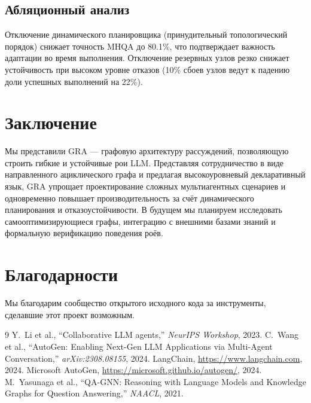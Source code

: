 \documentclass[11pt]{article}
\begin{document}
\subsection{Абляционный анализ}
Отключение динамического планировщика (принудительный топологический порядок) снижает точность MHQA до 80.1\%, что подтверждает важность адаптации во время выполнения.
Отключение резервных узлов резко снижает устойчивость при высоком уровне отказов (10\% сбоев узлов ведут к падению доли успешных выполнений на 22\%).

\section{Заключение}
Мы представили GRA — графовую архитектуру рассуждений, позволяющую строить гибкие и устойчивые рои LLM.
Представляя сотрудничество в виде направленного ациклического графа и предлагая высокоуровневый декларативный язык, GRA упрощает проектирование сложных мультиагентных сценариев и одновременно повышает производительность за счёт динамического планирования и отказоустойчивости.
В будущем мы планируем исследовать самооптимизирующиеся графы, интеграцию с внешними базами знаний и формальную верификацию поведения роёв.

\section*{Благодарности}
Мы благодарим сообщество открытого исходного кода за инструменты, сделавшие этот проект возможным.


\begin{thebibliography}{9}
Y.~Li et al., ``Collaborative LLM agents,'' \textit{NeurIPS Workshop}, 2023.
C.~Wang et al., ``AutoGen: Enabling Next-Gen LLM Applications via Multi-Agent Conversation,'' \textit{arXiv:2308.08155}, 2024.
LangChain, \url{https://www.langchain.com}, 2024.
Microsoft AutoGen, \url{https://microsoft.github.io/autogen/}, 2024.
M.~Yasunaga et al., ``QA-GNN: Reasoning with Language Models and Knowledge Graphs for Question Answering,'' \textit{NAACL}, 2021.
\end{thebibliography}
\end{document}

